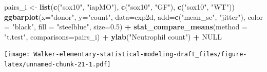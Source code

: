 \documentclass[]{book}
\newenvironment{Shaded}{\begin{snugshade}}{\end{snugshade}}
\newcommand{\KeywordTok}[1]{\textcolor[rgb]{0.13,0.29,0.53}{\textbf{#1}}}
\newcommand{\DataTypeTok}[1]{\textcolor[rgb]{0.13,0.29,0.53}{#1}}
\newcommand{\FloatTok}[1]{\textcolor[rgb]{0.00,0.00,0.81}{#1}}
\newcommand{\StringTok}[1]{\textcolor[rgb]{0.31,0.60,0.02}{#1}}
\newcommand{\OtherTok}[1]{\textcolor[rgb]{0.56,0.35,0.01}{#1}}
\newcommand{\OperatorTok}[1]{\textcolor[rgb]{0.81,0.36,0.00}{\textbf{#1}}}
\newcommand{\NormalTok}[1]{#1}
\begin{document}
\begin{Shaded}
\begin{Highlighting}[]
\NormalTok{pairs_i <-}\StringTok{ }\KeywordTok{list}\NormalTok{(}\KeywordTok{c}\NormalTok{(}\StringTok{"sox10"}\NormalTok{, }\StringTok{"iapMO"}\NormalTok{), }\KeywordTok{c}\NormalTok{(}\StringTok{"sox10"}\NormalTok{, }\StringTok{"GF"}\NormalTok{), }\KeywordTok{c}\NormalTok{(}\StringTok{"sox10"}\NormalTok{, }\StringTok{"WT"}\NormalTok{))}
\KeywordTok{ggbarplot}\NormalTok{(}\DataTypeTok{x=}\StringTok{"donor"}\NormalTok{, }
          \DataTypeTok{y=}\StringTok{"count"}\NormalTok{, }
          \DataTypeTok{data=}\NormalTok{exp2d,}
          \DataTypeTok{add=}\KeywordTok{c}\NormalTok{(}\StringTok{"mean_se"}\NormalTok{, }\StringTok{"jitter"}\NormalTok{),}
          \DataTypeTok{color =} \StringTok{"black"}\NormalTok{,}
          \DataTypeTok{fill =} \StringTok{"steelblue"}\NormalTok{,}
          \DataTypeTok{size=}\FloatTok{0.5}\NormalTok{) }\OperatorTok{+}
\StringTok{  }\KeywordTok{stat_compare_means}\NormalTok{(}\DataTypeTok{method =} \StringTok{"t.test"}\NormalTok{, }\DataTypeTok{comparisons=}\NormalTok{pairs_i) }\OperatorTok{+}
\StringTok{  }\KeywordTok{ylab}\NormalTok{(}\StringTok{"Neutrophil count"}\NormalTok{) }\OperatorTok{+}
\StringTok{  }\OtherTok{NULL}
\end{Highlighting}
\end{Shaded}

\texttt{[image: Walker-elementary-statistical-modeling-draft\_files/figure-latex/unnamed-chunk-21-1.pdf]}
\end{document}
